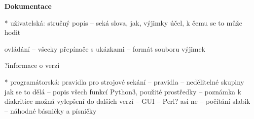 \language\czech

{\bf Dokumentace}

* uživatelská:
stručný popis -- seká slova, jak, výjimky
účel, k čemu se to může hodit

ovládání
-- všecky přepínače s ukázkami
-- formát souboru výjimek

?informace o verzi

* programátorská:
pravidla pro strojové sekání
-- pravidla
-- nedělitelné skupiny
jak se to dělá
-- popis všech funkcí
Python3, použité prostředky
-- poznámka k diakritice
možná vylepšení do dalších verzí
-- GUI
-- Perl? asi ne
-- počítání slabik
-- náhodné básničky a písničky
\bye
